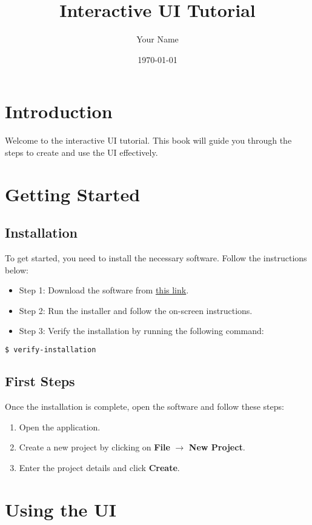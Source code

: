 \documentclass{book}
\title{Interactive UI Tutorial}
\author{Your Name}
\date{\today}
\begin{document}
\maketitle

\tableofcontents

\chapter{Introduction}
Welcome to the interactive UI tutorial. This book will guide you through the steps to create and use the UI effectively.

\chapter{Getting Started}
\section{Installation}
To get started, you need to install the necessary software. Follow the instructions below:

\begin{itemize}
    \item Step 1: Download the software from \href{http://example.com}{this link}.
    \item Step 2: Run the installer and follow the on-screen instructions.
    \item Step 3: Verify the installation by running the following command:
\end{itemize}

\begin{lstlisting}[language=bash]
$ verify-installation
\end{lstlisting}

\section{First Steps}
Once the installation is complete, open the software and follow these steps:

\begin{enumerate}
    \item Open the application.
    \item Create a new project by clicking on \textbf{File} $\rightarrow$ \textbf{New Project}.
    \item Enter the project details and click \textbf{Create}.
\end{enumerate}

\chapter{Using the UI}
\end{document}
